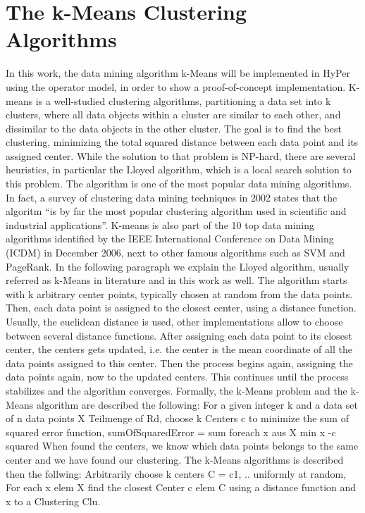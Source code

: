 \chapter{The k-Means Clustering Algorithms}\label{chapter:kmeans}

In this work, the data mining algorithm k-Means will be implemented in HyPer using the operator model, in order to show a proof-of-concept implementation.
K-means is a well-studied clustering algorithms, partitioning a data set into k clusters, where all data objects within a cluster are similar to each other, and dissimilar to the data objects in the other cluster. The goal is to find the best clustering, minimizing the total squared distance between each data point and its assigned center. While the solution to that problem is NP-hard, there are several heuristics, in particular the Lloyed algorithm, which is a local search solution to this problem. 
The algorithm is one of the most popular data mining algorithms. In fact, a survey of clustering data mining techniques in 2002 states that the algoritm “is by far the most popular clustering algorithm used in scientific and industrial applications”. K-means is also part of the 10 top data mining algorithms identified by the IEEE International Conference on Data Mining (ICDM) in December 2006, next to other famous algorithms such as SVM and PageRank. 
In the following paragraph we explain the Lloyed algorithm, usually referred as k-Means in literature and in this work as well. The algorithm starts with k arbitrary center points, typically chosen at random from the data points. Then, each data point is assigned to the closest center, using a distance function. Usually, the euclidean distance is used, other implementations allow to choose between several distance functions. After assigning each data point to its closest center, the centers gets updated, i.e. the center is the mean coordinate of all the data points assigned to this center. Then the process begins again, assigning the data points again, now to the updated centers. This continues until the process stabilizes and the algorithm converges.
Formally, the k-Means problem and the k-Means algorithm are described the following: For a given integer k and a data set of n data points X Teilmenge of Rd, choose k Centers c to minimize the sum of squared error function,
sumOfSquaredError = sum foreach x aus X min x -c squared
When found the centers, we know which data points belongs to the same center and we have found our clustering.
The k-Means algorithms is described then the follwing:
Arbitrarily choose k centers C = {c1, ..} uniformly at random,
For each x elem X find the closest Center c elem C using a distance function and x to a Clustering Clu.

